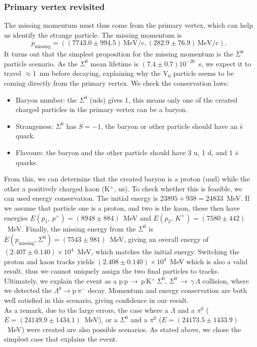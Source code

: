 \documentclass[twocolumn]{article}
\begin{document}
\subsubsection{Primary vertex revisited}
The missing momentum must thus come from the primary vertex, which can help us identify the strange particle. The missing momentum is
\begin{equation}
p_{\text{missing}} = ( (7743.0 \pm 994.5)\, \text{MeV/c,} \, (282.9 \pm 76.9) \, \text{MeV/c} ). \nonumber
\end{equation}
It turns out that the simplest proposition for the missing momentum is the $\Sigma^0$ particle scenario. As the $\Sigma^0$ mean lifetime is $(7.4 \pm 0.7)10^{-20}$~s,\cite{pdg} we expect it to travel $\approx 1$~nm before decaying, explaining why the V$_0$ particle seems to be coming directly from the primary vertex. We check the conservation laws:
\begin{itemize}
	\item Baryon number: the $\Sigma^0$ (uds) gives 1, this means only one of the created charged particles in the primary vertex can be a baryon.
	\item Strangeness: $\Sigma^0$ has $S = -1$, the baryon or other particle should have an $\bar{\text{s}}$ quark.
	\item Flavours: the baryon and the other particle should have 3 u, 1 d, and 1 $\bar{s}$ quarks.
\end{itemize}
From this, we can determine that the created baryon is a proton (uud) while the other a positively charged kaon (K$^+$, u$\bar{\text{s}}$). To check whether this is feasible, we can used energy conservation. The initial energy is $23895 + 938 = 24833$~MeV. If we assume that particle one is a proton, and two is the kaon, these then have energies $E(p_1, \, p^+) = (8948 \pm 884)$~MeV and $E(p_2, \, K^+) = (7580 \pm 442)$~MeV. Finally, the missing energy from the $\Sigma^0$ is $E(p_{\text{missing}}, \Sigma^0) = (7543 \pm 981)$~MeV, giving an overall energy of $(2.407 \pm 0.140)\times 10^4$~MeV, which matches the initial energy. Switching the proton and kaon tracks yields $(2.408 \pm 0.140)\times 10^4$~MeV which is also a valid result, thus we cannot uniquely assign the two final particles to tracks. Ultimately, we explain the event as a p$\,$p$\,\rightarrow\,$p$\,$K$^+\,\Sigma^0,\,\Sigma^0 \, \rightarrow \, \gamma \, \Lambda$ collision, where we detected the $\Lambda^0 \rightarrow \text{p}\, \pi^-$ decay. Momentum and energy conservation are both well satisfied in this scenario, giving confidence in our result.\\
As a remark, due to the large errors, the case where a $\Lambda$ and a $\pi^0$ ($E = (24149.9 \pm 1434.1)$~MeV), or a $\Sigma^0$ and a $\pi^0$ ($E = (24173.5 \pm 1433.9)$~MeV) were created are also possible scenarios. As stated above, we chose the simplest case that explains the event.
\end{document}
